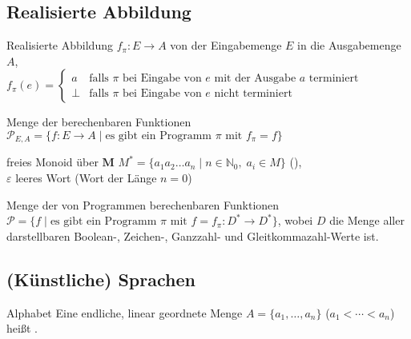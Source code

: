 \subsection{%
    Realisierte Abbildung%
}

\begin{Def}{Realisierte Abbildung} $f_\pi: E \rightarrow A$ von der
    Eingabemenge $E$ in die Ausgabemenge $A$, \\
    $f_\pi(e) =
    \begin{cases}
        a & \text{falls } \pi \text{ bei Eingabe von } e
        \text{ mit der Ausgabe } a \text{ terminiert} \\
        \bot & \text{falls } \pi \text{ bei Eingabe von } e
        \text{ nicht terminiert}
    \end{cases}$
\end{Def}

\begin{Def}{Menge der berechenbaren Funktionen}\\
    $\mathcal{P}_{E,A} = \{f: E \rightarrow A \;|\; \text{es gibt ein
    Programm } \pi \text{ mit } f_\pi = f\}$
\end{Def}

\begin{Def}{freies Monoid über $\boldsymbol{M}$}
    $M^\ast = \{a_1 a_2 \ldots a_n \;|\;
    n \in \mathbb{N}_0,\; a_i \in M\}$ (), \\
    $\varepsilon$ leeres Wort (Wort der Länge $n=0$)
\end{Def}

\begin{Def}{Menge der von Programmen berechenbaren Funktionen}\\
    $\mathcal{P} = \{f \;|\; \text{es gibt ein Programm } \pi \text{ mit }
    f = f_\pi: D^\ast \rightarrow D^\ast\}$, wobei
    $D$ die Menge aller darstellbaren Boolean-, Zeichen-, Ganzzahl- und
    Gleitkommazahl-Werte ist.
\end{Def}

\subsection{%
    (Künstliche) Sprachen%
}

\begin{Def}{Alphabet}
    Eine endliche, linear geordnete Menge $A = \{a_1, \ldots, a_n\}$ \quad
    ($a_1 < \cdots < a_n$) heißt .
\end{Def}

